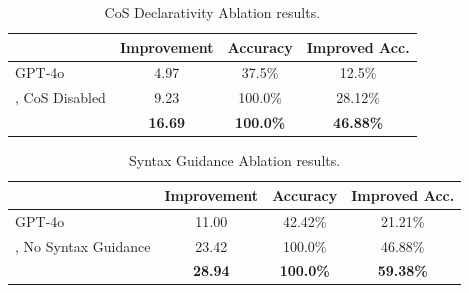 

\begin{table}[t]
\caption{CoS Declarativity Ablation results.}
\label{tab:read-abl}
\centering
\small
\begin{tabular}{l|ccc}
\toprule
& Improvement& Accuracy & Improved Acc.\\
\midrule
GPT-4o&{4.97} & {37.5\%} & {12.5\%} \\
\methodname{}, CoS Disabled &  9.23 & 100.0\% & 28.12\% \\
\textbf{\methodname{}} &  \textbf{16.69} & \textbf{100.0\%} & \textbf{46.88\%} \\
\bottomrule
\end{tabular}

\vspace{-1em} %
\end{table}








\begin{table}[t]
\caption{Syntax Guidance Ablation results.}
\label{tab:syn-abl}
\centering
\small
\begin{tabular}{l|ccc}
\toprule
& Improvement& Accuracy & Improved Acc.\\
\midrule
GPT-4o&{11.00} & {42.42\%} & {21.21\%} \\
\methodname{}, No Syntax Guidance &  23.42 & 100.0\% & 46.88\% \\
\textbf{\methodname{}} &  \textbf{28.94} & \textbf{100.0\%} & \textbf{59.38\%} \\
\bottomrule
\end{tabular}

\vspace{-1em} %
\end{table}


